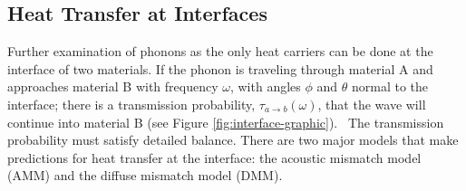 \subsection{Heat Transfer at Interfaces}
Further examination of phonons as the only heat carriers can be done at the interface of two materials. If the phonon is traveling through material A and approaches material B with frequency $\omega$, with angles $\phi$ and $\theta$ normal to the interface; there is a transmission probability, $\tau_{a\rightarrow b}(\omega)$, that the wave will continue into material B (see Figure \ref{fig:interface-graphic}).~\cite{Monachon2016} 
The transmission probability must satisfy detailed balance.
There are two major models that make predictions for heat transfer at the interface: the acoustic mismatch model (AMM) and the diffuse mismatch model (DMM).~\cite{Monachon2016}
